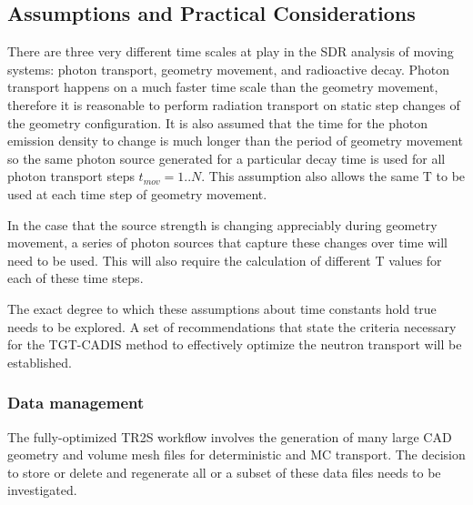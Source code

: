 \subsection{Assumptions and Practical Considerations}
There are three very different time scales at play in the SDR analysis of 
moving systems: photon transport,
geometry movement, and radioactive decay.
Photon transport happens on a much
faster time scale than the geometry movement, therefore it is reasonable to
perform radiation transport on static step changes of the geometry
configuration.  It is also assumed that the
time for the photon emission density to change is much longer than the
period of geometry movement %
so the same photon source generated for a particular decay time
is used for all photon transport steps $t_{mov} = 1..N$.
This assumption also allows the same T to be used at each time step of geometry movement.

In the case that the source strength is changing appreciably during geometry
movement, a  series of photon sources that capture these changes over time
will need to be used.  This will also require the calculation of different T
values for each of these time steps.


The exact degree to which these assumptions about time constants hold true
needs to be explored. A set of recommendations %
that state the criteria 
necessary for the TGT-CADIS method to effectively optimize the neutron
transport  will
be established.

\subsubsection{Data management}
The fully-optimized TR2S workflow involves the generation of many large
CAD geometry and volume mesh files for deterministic and MC transport.
The decision to store or delete and regenerate all or a subset of these data files needs to
be investigated.

